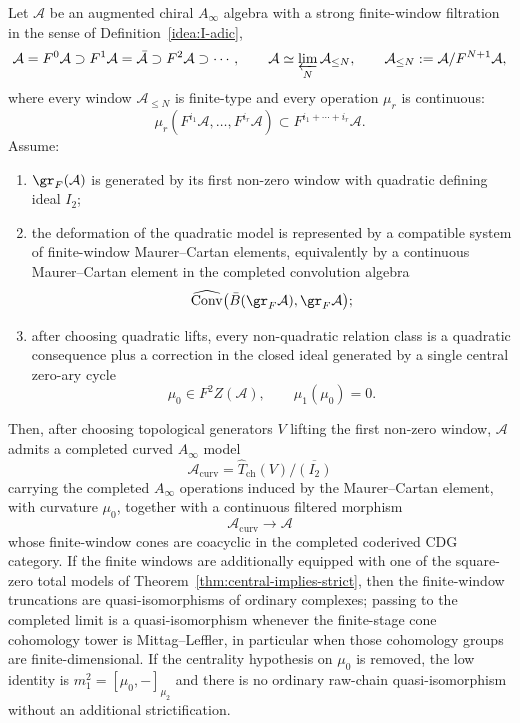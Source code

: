 \begin{proposition}\label{prop:filtered-to-curved-fc}
Let $\mathcal{A}$ be an augmented chiral $A_\infty$ algebra with a
strong finite-window filtration in the sense of
Definition~\ref{idea:I-adic},
\[
\mathcal{A}=F^0\mathcal{A}\supset F^1\mathcal{A}=\bar{\mathcal{A}}
\supset F^2\mathcal{A}\supset\cdots,\qquad
\mathcal{A}\simeq\varprojlim_N\mathcal{A}_{\le N},\qquad
\mathcal{A}_{\le N}:=\mathcal{A}/F^{N+1}\mathcal{A},
\]
where every window $\mathcal{A}_{\le N}$ is finite-type and every
operation $\mu_r$ is continuous:
\[
\mu_r(F^{i_1}\mathcal{A},\ldots,F^{i_r}\mathcal{A})
\subset F^{i_1+\cdots+i_r}\mathcal{A}.
\]
Assume:
\begin{enumerate}
\item $\gr_F(\mathcal{A})$ is generated by its first non-zero
window with quadratic defining ideal $I_2$;
\item the deformation of the quadratic model is represented by a
compatible system of finite-window Maurer--Cartan elements, equivalently
by a continuous Maurer--Cartan element in the completed convolution
algebra
\[
\widehat{\operatorname{Conv}}
\bigl(\bar B(\gr_F\mathcal{A}),\gr_F\mathcal{A}\bigr);
\]
\item after choosing quadratic lifts, every non-quadratic relation
class is a quadratic consequence plus a correction in the closed ideal
generated by a single central zero-ary cycle
\[
\mu_0\in F^2 Z(\mathcal{A}),\qquad \mu_1(\mu_0)=0.
\]
\end{enumerate}
Then, after choosing topological generators $V$ lifting the first
non-zero window, $\mathcal{A}$ admits a completed curved $A_\infty$
model
\[
\mathcal{A}_{\mathrm{curv}}
=\widehat{T}_{\mathrm{ch}}(V)/\overline{(I_2)}
\]
carrying the completed $A_\infty$ operations induced by the
Maurer--Cartan element, with curvature $\mu_0$, together with a
continuous filtered morphism
\[
\mathcal{A}_{\mathrm{curv}}\longrightarrow\mathcal{A}
\]
whose finite-window cones are coacyclic in the completed coderived CDG
category.  If the finite windows are additionally equipped with one of
the square-zero total models of
Theorem~\ref{thm:central-implies-strict}, then the finite-window
truncations are quasi-isomorphisms of ordinary complexes; passing to
the completed limit is a quasi-isomorphism whenever the finite-stage
cone cohomology tower is Mittag--Leffler, in particular when those
cohomology groups are finite-dimensional.  If the centrality hypothesis
on $\mu_0$ is removed, the low identity is
$m_1^2=[\mu_0,-]_{\mu_2}$ and there is no ordinary raw-chain
quasi-isomorphism without an additional strictification.
\end{proposition}

